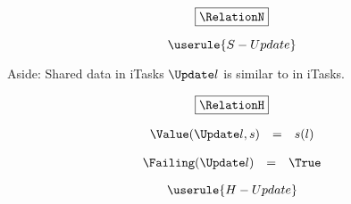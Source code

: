 \begin{equation*}
  \boxed{\RelationN}
\end{equation*}

\begin{equation*}
  \userule{S-Update}
\end{equation*}

\begin{margintext}{Aside: Shared data in iTasks}
  $\Update l$ is similar to  in iTasks.
\end{margintext}

\begin{equation*}
  \boxed{\RelationH}
\end{equation*}

\begin{equation*}
  \begin{array}{lcl}
    \Value(\Update l, s) &=& s(l)
  \end{array}
\end{equation*}

\begin{equation*}
  \begin{array}{lcl}
    \Failing(\Update l) &=& \True
  \end{array}
\end{equation*}

\begin{equation*}
  \userule{H-Update}
\end{equation*}
